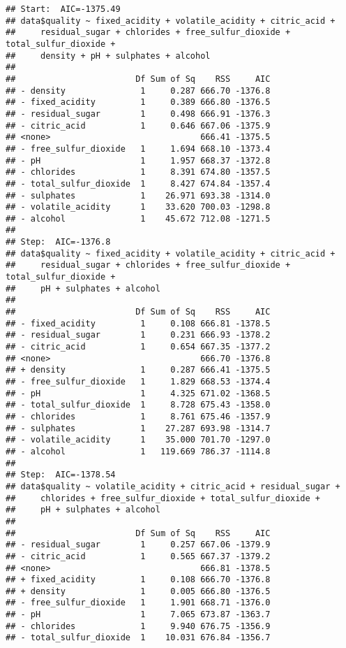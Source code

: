 \documentclass{article}
\begin{document}
\begin{verbatim}
## Start:  AIC=-1375.49
## data$quality ~ fixed_acidity + volatile_acidity + citric_acid + 
##     residual_sugar + chlorides + free_sulfur_dioxide + total_sulfur_dioxide + 
##     density + pH + sulphates + alcohol
## 
##                        Df Sum of Sq    RSS     AIC
## - density               1     0.287 666.70 -1376.8
## - fixed_acidity         1     0.389 666.80 -1376.5
## - residual_sugar        1     0.498 666.91 -1376.3
## - citric_acid           1     0.646 667.06 -1375.9
## <none>                              666.41 -1375.5
## - free_sulfur_dioxide   1     1.694 668.10 -1373.4
## - pH                    1     1.957 668.37 -1372.8
## - chlorides             1     8.391 674.80 -1357.5
## - total_sulfur_dioxide  1     8.427 674.84 -1357.4
## - sulphates             1    26.971 693.38 -1314.0
## - volatile_acidity      1    33.620 700.03 -1298.8
## - alcohol               1    45.672 712.08 -1271.5
## 
## Step:  AIC=-1376.8
## data$quality ~ fixed_acidity + volatile_acidity + citric_acid + 
##     residual_sugar + chlorides + free_sulfur_dioxide + total_sulfur_dioxide + 
##     pH + sulphates + alcohol
## 
##                        Df Sum of Sq    RSS     AIC
## - fixed_acidity         1     0.108 666.81 -1378.5
## - residual_sugar        1     0.231 666.93 -1378.2
## - citric_acid           1     0.654 667.35 -1377.2
## <none>                              666.70 -1376.8
## + density               1     0.287 666.41 -1375.5
## - free_sulfur_dioxide   1     1.829 668.53 -1374.4
## - pH                    1     4.325 671.02 -1368.5
## - total_sulfur_dioxide  1     8.728 675.43 -1358.0
## - chlorides             1     8.761 675.46 -1357.9
## - sulphates             1    27.287 693.98 -1314.7
## - volatile_acidity      1    35.000 701.70 -1297.0
## - alcohol               1   119.669 786.37 -1114.8
## 
## Step:  AIC=-1378.54
## data$quality ~ volatile_acidity + citric_acid + residual_sugar + 
##     chlorides + free_sulfur_dioxide + total_sulfur_dioxide + 
##     pH + sulphates + alcohol
## 
##                        Df Sum of Sq    RSS     AIC
## - residual_sugar        1     0.257 667.06 -1379.9
## - citric_acid           1     0.565 667.37 -1379.2
## <none>                              666.81 -1378.5
## + fixed_acidity         1     0.108 666.70 -1376.8
## + density               1     0.005 666.80 -1376.5
## - free_sulfur_dioxide   1     1.901 668.71 -1376.0
## - pH                    1     7.065 673.87 -1363.7
## - chlorides             1     9.940 676.75 -1356.9
## - total_sulfur_dioxide  1    10.031 676.84 -1356.7

\end{verbatim}
\end{document}
